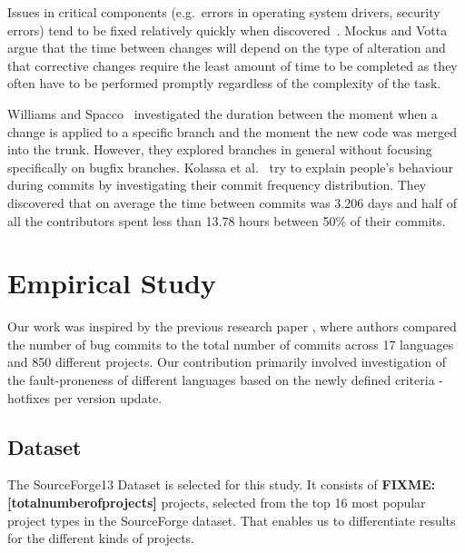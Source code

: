 \documentclass{sig-alternate}
\newcommand\FIXME[1]{\textbf{FIXME: #1}}
\begin{document}
Issues in critical components (e.g.~errors in operating system drivers, security errors) tend to be fixed relatively quickly when discovered~\cite{Livshits2005}. Mockus and Votta~\cite{Mockus2000} argue that the time between changes will depend on the type of alteration and that corrective changes require the least amount of time to be completed as they often have to be performed promptly regardless of the complexity of the task.

Williams and Spacco~\cite{Williams2008} investigated the duration between the moment when a change is applied to a specific branch and the moment the new code was merged into the trunk. However, they explored branches in general without focusing specifically on bugfix branches. Kolassa et al.~\cite{Kolassa2013} try to explain people's behaviour during commits by investigating their commit frequency distribution. They discovered that on average the time between commits was 3.206 days and half of all the contributors spent less than 13.78 hours between 50\% of their commits.



\section{Empirical Study}


Our work was inspired by the previous research paper \cite{Ray2014}, where authors compared the number of bug commits to the total number of commits across 17 languages and 850 different projects. Our contribution primarily involved investigation of the fault-proneness of different languages based on the newly defined criteria - hotfixes per version update. 

\subsection{Dataset}
The SourceForge13 Dataset is selected for this study. It consists of \FIXME{[totalnumberofprojects]} projects, selected from the top 16 most popular project types in the SourceForge dataset. That enables us to differentiate results for the different kinds of projects.
\end{document}
